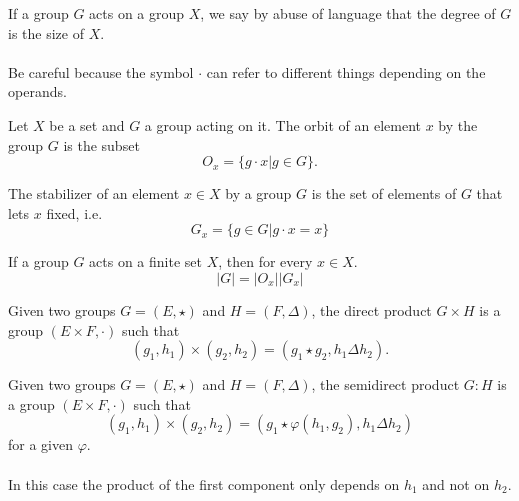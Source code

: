 \begin{definition}[Degree]
  If a group $G$ acts on a group $X$, we say by abuse of language that the degree of $G$ is the size of $X$.
\end{definition}

\paragraph{}
Be careful because the symbol $\cdot$ can refer to different things depending on the operands.

\begin{definition}
  Let $X$ be a set and $G$ a group acting on it.
  The orbit of an element $x$ by the group $G$ is the subset
  \[
    O_x = \{g \cdot x | g \in G\}.
  \]
\end{definition}

\begin{definition}
  The stabilizer of an element $x\in X$ by a group $G$ is the set of elements of $G$ that lets $x$ fixed, i.e.
  \[
    G_x = \{g \in G | g \cdot x = x\}
  \]
\end{definition}

\begin{property}
  \label{orbit-stabilizer}
  If a group $G$ acts on a finite set $X$, then for every $x \in X$.
  \[
    |G| = |O_x||G_x|
  \]
\end{property}

\begin{definition}
  Given two groups $G = (E, \star)$ and $H = (F, \Delta)$, the direct product $G \times H$ is a group $(E \times F, \cdot)$ such that
  \[
    (g_1, h_1) \times (g_2, h_2) = (g_1 \star g_2, h_1 \Delta h_2).
  \]
\end{definition}

\begin{definition}
  Given two groups $G = (E, \star)$ and $H = (F, \Delta)$, the semidirect product $G : H$ is a group $(E \times F, \cdot)$ such that
  \[
    (g_1, h_1) \times (g_2, h_2) = (g_1 \star \varphi(h_1,g_2), h_1 \Delta h_2)
  \]
  for a given $\varphi$.

  \paragraph{}
  In this case the product of the first component only depends on $h_1$ and not on $h_2$.
\end{definition}

